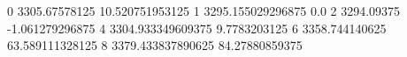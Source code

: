 0 3305.67578125 10.520751953125
1 3295.155029296875 0.0
2 3294.09375 -1.061279296875
4 3304.933349609375 9.7783203125
6 3358.744140625 63.589111328125
8 3379.433837890625 84.27880859375
